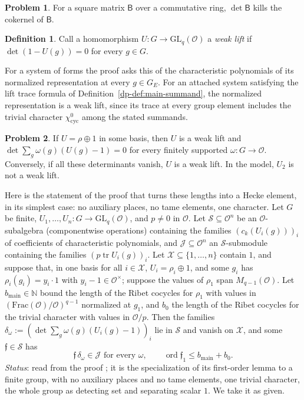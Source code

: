 \documentclass[reqno]{amsart}
\theoremstyle{definition}
\newtheorem{problem}{Problem}[section]
\newtheorem{definition}{Definition}[section]
\theoremstyle{plain}
\newcommand{\Oc}{\mathcal{O}}
\newcommand{\ord}{\operatorname{ord}}
\newcommand{\tr}{\operatorname{tr}}
\newcommand{\GL}{\mathrm{GL}}
\newcommand{\cyc}{\chi_{\mathrm{cyc}}}
\begin{document}
\begin{problem}\label{pr:det-kills}
For a square matrix \(\mathsf B\) over a commutative ring, \(\det \mathsf B\) kills the cokernel of \(\mathsf B\).
\end{problem}

\begin{definition}\label{def:weak}
Call a homomorphism \(U \colon G \to \GL_q(\Oc)\) a \emph{weak lift} if \(\det(1 - U(g)) = 0\) for every \(g \in G\).
\end{definition}

For a system of forms the proof asks this of the characteristic polynomials of its normalized representation at every \(g \in G_E\).  For an attached system satisfying the lift trace formula of Definition~\ref{dp-def:main-summand}, the normalized representation is a weak lift, since its trace at every group element includes the trivial character \(\cyc^0\) among the stated summands.

\begin{problem}\label{pr:weak}
If \(U = \rho \oplus 1\) in some basis, then \(U\) is a weak lift and \(\det \sum_g \omega(g)(U(g) - 1) = 0\) for every finitely supported \(\omega \colon G \to \Oc\).  Conversely, if all these determinants vanish, \(U\) is a weak lift.  In the model, \(U_2\) is not a weak lift.
\end{problem}

Here is the statement of the proof that turns these lengths into a Hecke element, in its simplest case: no auxiliary places, no tame elements, one character.  Let \(G\) be finite, \(U_1, \dots, U_n \colon G \to \GL_q(\Oc)\), and \(p \ne 0\) in \(\Oc\).  Let \(\mathcal S \subseteq \Oc^n\) be an \(\Oc\)-subalgebra (componentwise operations) containing the families \((c_k(U_i(g)))_i\) of coefficients of characteristic polynomials, and \(\mathcal J \subseteq \Oc^n\) an \(\mathcal S\)-submodule containing the families \((p \tr U_i(g))_i\).  Let \(\mathcal X \subseteq \{1, \dots, n\}\) contain \(1\), and suppose that, in one basis for all \(i \in \mathcal X\), \(U_i = \rho_i \oplus 1\), and some \(g_i\) has \(\rho_i(g_i) = y_i \cdot 1\) with \(y_i - 1 \in \Oc^\times\); suppose the values of \(\rho_1\) span \(M_{q-1}(\Oc)\).  Let \(b_{\mathrm{main}} \in \mathbb N\) bound the length of the Ribet cocycles for \(\rho_1\) with values in \((\mathrm{Frac}(\Oc)/\Oc)^{q-1}\) normalized at \(g_1\), and \(b_0\) the length of the Ribet cocycles for the trivial character with values in \(\Oc/p\).  Then the families \(\delta_\omega := (\det \sum_g \omega(g)(U_i(g) - 1))_i\) lie in \(\mathcal S\) and vanish on \(\mathcal X\), and some \(\mathfrak f \in \mathcal S\) has
\[
  \mathfrak f\,\delta_\omega \in \mathcal J \text{ for every } \omega, \qquad \ord \mathfrak f_1 \le b_{\mathrm{main}} + b_0 .
\]
\emph{Status}: read from the proof \cite{GL}; it is the specialization of its first-order lemma to a finite group, with no auxiliary places and no tame elements, one trivial character, the whole group as detecting set and separating scalar \(1\).  We take it as given.
\end{document}
